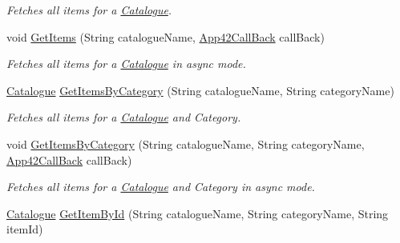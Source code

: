 \begin{DoxyCompactItemize}
\begin{DoxyCompactList}\small\item\em Fetches all items for a \hyperlink{classcom_1_1shephertz_1_1app42_1_1paas_1_1sdk_1_1csharp_1_1shopping_1_1_catalogue}{Catalogue}. \end{DoxyCompactList}\item 
void \hyperlink{classcom_1_1shephertz_1_1app42_1_1paas_1_1sdk_1_1csharp_1_1shopping_1_1_catalogue_service_abd1f3dc4a1d04b56f65811b279040e59}{Get\+Items} (String catalogue\+Name, \hyperlink{interfacecom_1_1shephertz_1_1app42_1_1paas_1_1sdk_1_1csharp_1_1_app42_call_back}{App42\+Call\+Back} call\+Back)
\begin{DoxyCompactList}\small\item\em Fetches all items for a \hyperlink{classcom_1_1shephertz_1_1app42_1_1paas_1_1sdk_1_1csharp_1_1shopping_1_1_catalogue}{Catalogue} in async mode. \end{DoxyCompactList}\item 
\hyperlink{classcom_1_1shephertz_1_1app42_1_1paas_1_1sdk_1_1csharp_1_1shopping_1_1_catalogue}{Catalogue} \hyperlink{classcom_1_1shephertz_1_1app42_1_1paas_1_1sdk_1_1csharp_1_1shopping_1_1_catalogue_service_a40a783e796446ee94ee55a0cc3ba6ac5}{Get\+Items\+By\+Category} (String catalogue\+Name, String category\+Name)
\begin{DoxyCompactList}\small\item\em Fetches all items for a \hyperlink{classcom_1_1shephertz_1_1app42_1_1paas_1_1sdk_1_1csharp_1_1shopping_1_1_catalogue}{Catalogue} and Category. \end{DoxyCompactList}\item 
void \hyperlink{classcom_1_1shephertz_1_1app42_1_1paas_1_1sdk_1_1csharp_1_1shopping_1_1_catalogue_service_a6b1920e4c8f9a0663a9b6fb468a63dd4}{Get\+Items\+By\+Category} (String catalogue\+Name, String category\+Name, \hyperlink{interfacecom_1_1shephertz_1_1app42_1_1paas_1_1sdk_1_1csharp_1_1_app42_call_back}{App42\+Call\+Back} call\+Back)
\begin{DoxyCompactList}\small\item\em Fetches all items for a \hyperlink{classcom_1_1shephertz_1_1app42_1_1paas_1_1sdk_1_1csharp_1_1shopping_1_1_catalogue}{Catalogue} and Category in async mode. \end{DoxyCompactList}\item 
\hyperlink{classcom_1_1shephertz_1_1app42_1_1paas_1_1sdk_1_1csharp_1_1shopping_1_1_catalogue}{Catalogue} \hyperlink{classcom_1_1shephertz_1_1app42_1_1paas_1_1sdk_1_1csharp_1_1shopping_1_1_catalogue_service_aa9fc585c3d7eaa5d65094d44a715c5c8}{Get\+Item\+By\+Id} (String catalogue\+Name, String category\+Name, String item\+Id)

\end{DoxyCompactItemize}
